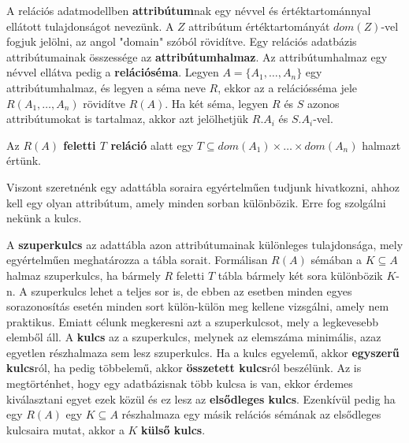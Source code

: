 \begin{defi}
A relációs adatmodellben \textbf{attribútum}nak egy névvel és értéktartománnyal ellátott tulajdonságot nevezünk. A $Z$ attribútum értéktartományát $dom(Z)$-vel fogjuk jelölni, az angol "domain" szóból rövidítve. Egy relációs adatbázis attribútumainak összessége az \textbf{attribútumhalmaz}. Az attribútumhalmaz egy névvel ellátva pedig a \textbf{relációséma}. Legyen $A = \{A_1,\ldots,A_n\}$ egy attribútumhalmaz, és legyen a séma neve $R$, ekkor az a relációsséma jele $R(A_1,\ldots,A_n)$ rövidítve $R(A)$. Ha két séma, legyen $R$ és $S$ azonos attribútumokat is tartalmaz, akkor azt jelölhetjük $R.A_i$ és $S.A_i$-vel.
\end{defi}

\begin{defi}
Az \textbf{$R(A)$ feletti $T$ reláció} alatt egy $T \subseteq dom(A_1) \times \ldots \times dom(A_n)$ halmazt értünk.  
\end{defi}

Viszont szeretnénk egy adattábla soraira egyértelműen tudjunk hivatkozni, ahhoz kell egy olyan attribútum, amely minden sorban különbözik. Erre fog szolgálni nekünk a kulcs.

\begin{defi}
A \textbf{szuperkulcs} az adattábla azon attribútumainak különleges tulajdonsága, mely egyértelműen meghatározza a tábla sorait. Formálisan  $R(A)$ sémában a $K \subseteq A$ halmaz szuperkulcs, ha bármely $R$ feletti $T$ tábla bármely két sora különbözik $K$-n. A szuperkulcs lehet a teljes sor is, de ebben az esetben minden egyes sorazonosítás esetén minden sort külön-külön meg kellene vizsgálni, amely nem praktikus. Emiatt célunk megkeresni azt a szuperkulcsot, mely a legkevesebb elemből áll. A \textbf{kulcs} az a szuperkulcs, melynek az elemszáma minimális, azaz egyetlen részhalmaza sem lesz szuperkulcs. Ha a kulcs egyelemű, akkor \textbf{egyszerű kulcs}ról, ha pedig többelemű, akkor \textbf{összetett kulcs}ról beszélünk. Az is megtörténhet, hogy egy adatbázisnak több kulcsa is van, ekkor érdemes kiválasztani egyet ezek közül és ez lesz az \textbf{elsődleges kulcs}. Ezenkívül pedig ha egy $R(A)$ egy $K\subseteq A$ részhalmaza egy másik relációs sémának az elsődleges kulcsaira mutat, akkor a $K$ \textbf{külső kulcs}.
\end{defi}

